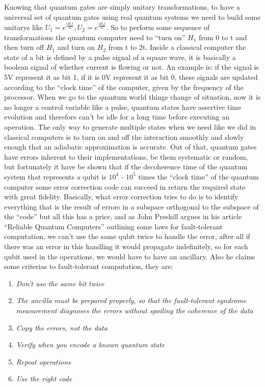 \documentclass[
  journal=largetwo,
  year=2023,
]{cup-journal}
\begin{document}
Knowing that quantum gates are simply unitary transformations, to have a universal set of quantum gates using real quantum systems we need to build some unitarys like \(U_1 = e^{\frac{iH_1t}{\hbar}}, U_2 = e^{\frac{iH_2t}{\hbar}}\). So to perform some sequence of transformations the quantum computer need to ``turn on'' \(H_1\) from 0 to t and then turn off \(H_1\) and turn on \(H_2\) from t to 2t.
Inside a classical computer the state of a bit is defined by a pulse signal of a square wave, it is basically a boolean signal of whether current is flowing or not. An example is: if the signal is 5V represent it as bit 1, if it is 0V represent it as bit 0, these signals are updated according to the ``clock time'' of the computer, given by the frequency of the processor. When we go to the quantum world things change of situation, now it is no longer a control variable like a pulse, quantum states have assertive time evolution and therefore can't be idle for a long time before executing an operation. The only way to generate multiple states when we need like we did in classical computers is to turn on and off the interaction smoothly and slowly enough that an adiabatic approximation is accurate. Out of that, quantum gates have errors inherent to their implementations, be them systematic or random, but fortunately it have be shown that if the decoherence time of the quantum system that represents a qubit is \(10^4\) - \(10^5\) times the ``clock time'' of the quantum computer some error correction code can succeed in return the required state with great fidelity. Basically, what error correction tries to do is to identify everything that is the result of errors in a subspace orthogonal to the subspace of the ``code'' but all this has a price, and as John Preskill argues in his article ``Reliable Quantum Computers'' outlining some laws for fault-tolerant computation, we can't use the same qubit twice to handle the error, after all if there was an error in this handling it would propagate indefinitely, so for each qubit used in the operations, we would have to have an ancillary. Also he claims some criterias to fault-tolerant computation, they are:\\

\begin{enumerate}
  \item \emph{Don't use the same bit twice}
  \item \emph{The ancilla must be prepared properly, so that the fault-tolerant syndrome
          measurement diagnoses the errors without spoiling the coherence of the data}
  \item \emph{Copy the
          errors, not the data}
  \item \emph{Verify when you encode a known quantum state}
  \item \emph{Repeat operations}
  \item \emph{Use the right code}
\end{enumerate}
\end{document}
